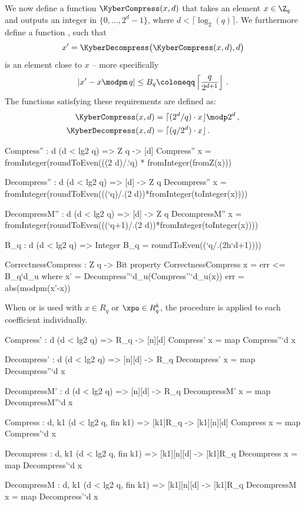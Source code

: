 We now define a function $\KyberCompress(x,d)$ that takes an element $x\in\Z_q$ and outputs an integer in $\{0,\dots,2^d-1\}$,
where $d<\lceil \log_2(q) \rceil$. We furthermore define a function \KyberDecompress, such that
\begin{equation}\label{eq:xprime}
x' = \KyberDecompress\big(\KyberCompress(x,d),d\big)
\end{equation}
is an element close to $x$ -- more specifically
\begin{equation}\label{eq:Bq} 
|x'-x\modpm\, q|\leq B_q\coloneqq \left\lceil \frac{q}{2^{d+1}}\right\rfloor\,.
\end{equation}
The functions satisfying these requirements are defined as:
\begin{align*}
  \KyberCompress(x,d)   &= \lceil (2^d/q)\cdot x \rfloor \modp 2^d\,,\\
  \KyberDecompress(x,d) &= \lceil (q/2^d)\cdot x \rfloor\,.
\end{align*}

\begin{code}
  Compress'' : {d} (d < lg2 q) => Z q -> [d]
  Compress'' x = fromInteger(roundToEven(((2^^`d)/.`q) * fromInteger(fromZ(x))) %

  Decompress'' : {d} (d < lg2 q) => [d] -> Z q 
  Decompress'' x = fromInteger(roundToEven(((`q)/.(2^^`d))*fromInteger(toInteger(x))))

  DecompressM'' : {d} (d < lg2 q) => [d] -> Z q 
  DecompressM'' x = fromInteger(roundToEven(((`q+1)/.(2^^`d))*fromInteger(toInteger(x))))


  B_q : {d} (d < lg2 q) => Integer
  B_q = roundToEven((`q/.(2^^(`d+1))))

  CorrectnessCompress : Z q -> Bit
  property CorrectnessCompress x = err <= B_q`{d_u} where
    x' = Decompress''`{d_u}(Compress''`{d_u}(x))
    err = abs(modpm(x'-x))
\end{code}

When \KyberCompress or \KyberDecompress is used with $x \in R_q$ or $\xpo \in R_q^k$, 
the procedure is applied to each coefficient individually.

\begin{code}
  Compress' : {d} (d < lg2 q) => R_q -> [n][d]
  Compress' x = map Compress''`{d} x
  
  Decompress' : {d} (d < lg2 q) => [n][d] -> R_q
  Decompress' x = map Decompress''`{d} x
  
  DecompressM' : {d} (d < lg2 q) => [n][d] -> R_q
  DecompressM' x = map DecompressM''`{d} x

  Compress : {d, k1} (d < lg2 q, fin k1) => [k1]R_q -> [k1][n][d]
  Compress x = map Compress'`{d} x
  
  Decompress : {d, k1} (d < lg2 q, fin k1) => [k1][n][d] -> [k1]R_q
  Decompress x = map Decompress'`{d} x

  DecompressM : {d, k1} (d < lg2 q, fin k1) => [k1][n][d] -> [k1]R_q
  DecompressM x = map Decompress'`{d} x
\end{code}

